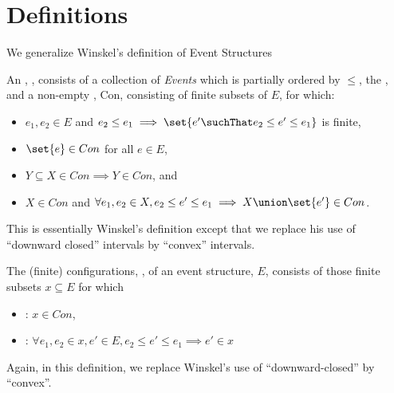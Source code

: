 
\section*{Definitions}

We generalize Winskel's definition of Event Structures \cite{winskel???}

\begin{definition}
An , , consists of a
collection of \emph{Events} which is partially ordered by $\leq$, the
, and a non-empty , Con, consisting of finite subsets of $E$, for which:

\begin{itemize}
  \item $e_1, e_2 \in E$ and $e_2 \leq e_1 \implies \set{e'\suchThat e_2 \leq e'
    \leq e_1}$ is finite,
  \item $\set{e} \in Con$ for all $e \in E$,
  \item $Y \subseteq X \in Con \implies Y \in Con$, and
    \item $X \in Con$ and $\forall e_1, e_2 \in X, e_2 \leq e' \leq e_1 \implies X
  \union \set{e'} \in Con$.
\end{itemize}
\end{definition}

This is essentially Winskel's definition except that we replace his use of
``downward closed'' intervals by ``convex'' intervals.

\begin{definition}
The (finite) configurations, , of an event structure, $E$, consists of
those finite subsets $x \subseteq E$ for which
\begin{itemize}
  \item {}: $x \in Con$,
  \item {}: $\forall e_1, e_2 \in x, e' \in E, e_2 \leq e'
    \leq e_1 \implies e' \in x$
\end{itemize}
\end{definition}

Again, in this definition, we replace Winskel's use of ``downward-closed'' by
``convex''.

